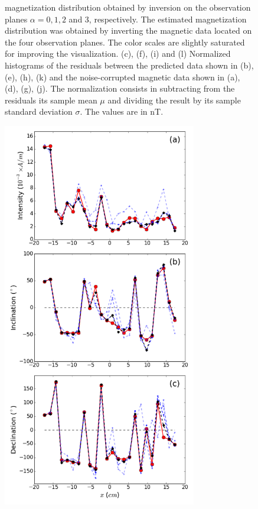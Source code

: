 \documentclass[draft,gc]{agutex}
\begin{document}
\begin{figure}
{ magnetization distribution obtained by inversion on the
 observation planes $\alpha = 0, 1, 2$ and $3$, respectively.
 The estimated magnetization distribution was obtained by
 inverting the magnetic data located on the four observation
 planes.
 The color scales are slightly saturated for improving the visualization.
 (c), (f), (i) and (l) Normalized histograms of the residuals between the
 predicted data shown in (b), (e), (h), (k) and the 
 noise-corrupted magnetic data shown in (a), (d), (g), (j). 
 The normalization
 consists in subtracting from the residuals its sample mean $\mu$ 
 and dividing the result by its sample standard deviation $\sigma$.
 The values are in nT.}
 \label{fig:datafit-oda}
 \end{figure}
 
 \begin{figure}
 \noindent \includegraphics[width=20pc]{Figs/Fig12_LQ.png}

\end{figure}
\end{document}
